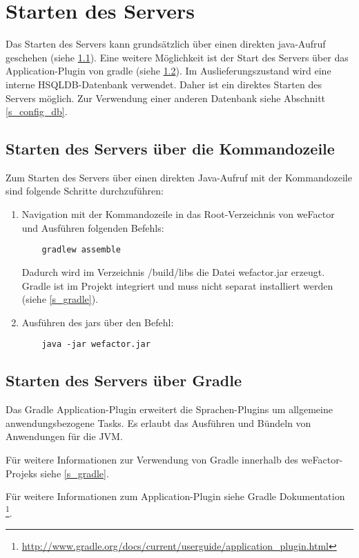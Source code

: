 \section{Starten des Servers}\label{s_startserver}
Das Starten des Servers kann grundsätzlich über einen direkten java-Aufruf geschehen (siehe \ref{s_startserver_java}). Eine weitere Möglichkeit ist der Start des Servers über das Application-Plugin von gradle (siehe \ref{s_startserver_gradle}). Im Auslieferungszustand wird eine interne HSQLDB-Datenbank verwendet. Daher ist ein direktes Starten des Servers möglich. Zur Verwendung einer anderen Datenbank siehe Abschnitt \ref{s_config_db}.

\subsection{Starten des Servers über die Kommandozeile}\label{s_startserver_java}
Zum Starten des Servers über einen direkten Java-Aufruf mit der Kommandozeile sind folgende Schritte durchzuführen:
   \begin{enumerate}

    \item Navigation mit der Kommandozeile in das Root-Verzeichnis von weFactor und Ausführen folgenden Befehls:
    \begin{lstlisting}
    gradlew assemble
    \end{lstlisting}
    Dadurch wird im Verzeichnis /build/libs die Datei wefactor.jar erzeugt. Gradle ist im Projekt integriert und muss nicht separat installiert werden (siehe \ref{s_gradle}).
    \item Ausführen des jars über den Befehl:
    \begin{lstlisting}
    java -jar wefactor.jar
    \end{lstlisting}

   \end{enumerate}


\subsection{Starten des Servers über Gradle}\label{s_startserver_gradle}
Das Gradle Application-Plugin erweitert die Sprachen-Plugins um allgemeine anwendungsbezogene Tasks. Es erlaubt das Ausführen und Bündeln von Anwendungen für die \ac{JVM}.

Für weitere Informationen zur Verwendung von Gradle innerhalb des weFactor-Projeks siehe \ref{s_gradle}.

Für weitere Informationen zum Application-Plugin siehe
Gradle Dokumentation
\footnote{\url{http://www.gradle.org/docs/current/userguide/application_plugin.html}}.

